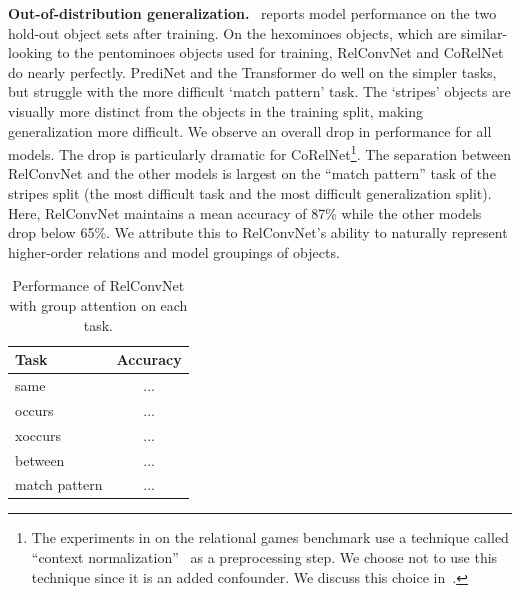 \textbf{Out-of-distribution generalization.}~ reports model performance on the two hold-out object sets after training. On the hexominoes objects, which are similar-looking to the pentominoes objects used for training, RelConvNet and CoRelNet do nearly perfectly. PrediNet and the Transformer do well on the simpler tasks, but struggle with the more difficult `match pattern' task. The `stripes' objects are visually more distinct from the objects in the training split, making generalization more difficult. We observe an overall drop in performance for all models. The drop is particularly dramatic for CoRelNet\footnote{The experiments in \citep{kergNeuralArchitecture2022} on the relational games benchmark use a technique called ``context normalization''~\citep{webbLearningRepresentationsThat2020} as a preprocessing step. We choose not to use this technique since it is an added confounder. We discuss this choice in~.}.
The separation between RelConvNet and the other models is largest on the ``match pattern'' task of the stripes split (the most difficult task and the most difficult generalization split). Here, RelConvNet maintains a mean accuracy of 87\% while the other models drop below 65\%. We attribute this to RelConvNet's ability to naturally represent higher-order relations and model groupings of objects.

\begin{table}
    \begin{tabular}{lc}
        \toprule
        Task & Accuracy \\
        \midrule
        same & ...\\
        occurs & ... \\
        xoccurs & ...\\
        between & ... \\
        match pattern & ...\\
        \bottomrule
    \end{tabular}
    \caption{Performance of RelConvNet with group attention on each task.}\label{tab:relgames_groupattn_resuls}
\end{table}

